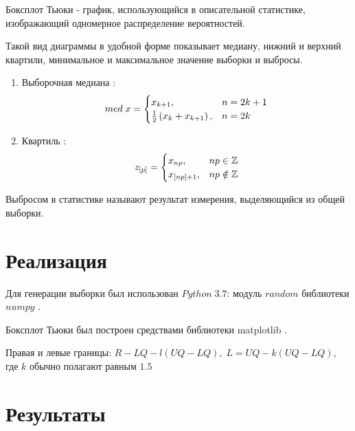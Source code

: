 \documentclass[12pt]{article}
\begin{document}
Боксплот Тьюки - график, использующийся в описательной статистике, изображающий одномерное распределение вероятностей. \cite{sas}

Такой вид диаграммы в удобной форме показывает медиану, нижний и верхний квартили, минимальное и максимальное значение выборки и выбросы.

\begin{enumerate}
\item Выборочная медиана \cite{med}:
\begin{equation}
med\; x = \begin{cases}
x_{k+1}, & n = 2k+1\\
\frac{1}{2}\left(x_k+x_{k+1}\right), & n = 2k
\end{cases} \hfill  \label{eqn:med}
\end{equation}

\item Квартиль \cite{quart}:
\begin{equation}
z_{[p]} = \begin{cases}
x_{np}, & np \in \mathbb{Z}\\
x_{[np]+1}, & np \notin \mathbb{Z}
\end{cases} \hfill  \label{eqn:quart}
\end{equation}
\end{enumerate}

Выбросом в статистике называют результат измерения, выделяющийся из общей выборки.


\section{Реализация}

Для генерации выборки был использован $Python\;3.7$: модуль $random$ библиотеки $numpy$ \cite{numpy}.

Боксплот Тьюки был построен средствами библиотеки matplotlib \cite{plotlib}.

Правая и левые границы:  $R- LQ - l(UQ - LQ),\;L = UQ -k(UQ - LQ),$ где $k$ обычно полагают равным $1.5$ 

\section{Результаты}
\end{document}
